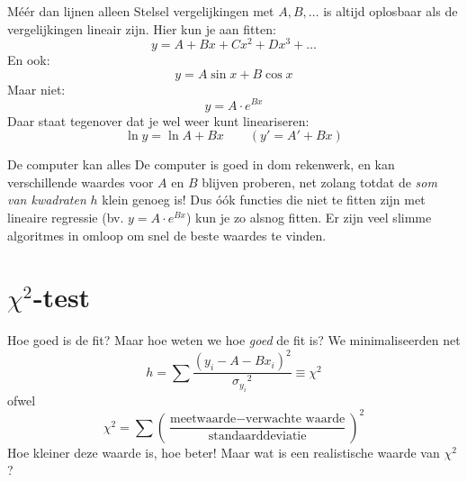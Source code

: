 \documentclass{beamer}
\begin{document}
\begin{frame}{Méér dan lijnen alleen}
  Stelsel vergelijkingen met $A, B, \ldots$ is altijd oplosbaar als de vergelijkingen \alert{lineair} zijn. Hier kun je aan fitten:
  \begin{equation*}
    y = A + Bx + Cx^2 + Dx^3 + \ldots
  \end{equation*}
  \pause
  En ook:
  \begin{equation*}
    y = A\sin x + B\cos x
  \end{equation*}
  \pause
  Maar niet:
  \begin{equation*}
    y = A\cdot e^{Bx}
  \end{equation*}
  \pause
  Daar staat tegenover dat je wel weer kunt \alert{lineariseren}:
  \begin{equation*}
    \ln y = \ln A + Bx  \qquad (y' = A' + Bx)
  \end{equation*}
\end{frame}

\begin{frame}{De computer kan alles}
  De computer is goed in dom rekenwerk, en kan verschillende waardes voor $A$ en $B$ blijven proberen, net zolang totdat de \emph{som van kwadraten} $h$ klein genoeg is! Dus óók functies die niet te fitten zijn met lineaire regressie (bv. $y = A\cdot e^{Bx}$) kun je zo alsnog fitten. Er zijn veel slimme algoritmes in omloop om snel de beste waardes te vinden.
\end{frame}


\section{$\chi^2$-test}

\begin{frame}{Hoe goed is de fit?}
  Maar hoe weten we hoe \emph{goed} de fit is? We minimaliseerden net
  \begin{equation*}
    h = \sum\frac{(y_i - A - Bx_i)^2}{{\sigma_{y_i}}^2} \equiv \chi^2
  \end{equation*}
  ofwel
  \begin{equation*}
    \chi^2 = \sum\left(\frac{\text{meetwaarde} - \text{verwachte waarde}}{\text{standaarddeviatie}}\right)^2
  \end{equation*}
  Hoe kleiner deze waarde is, hoe beter! Maar wat is een realistische waarde van $\chi^2$?
\end{frame}
\end{document}
